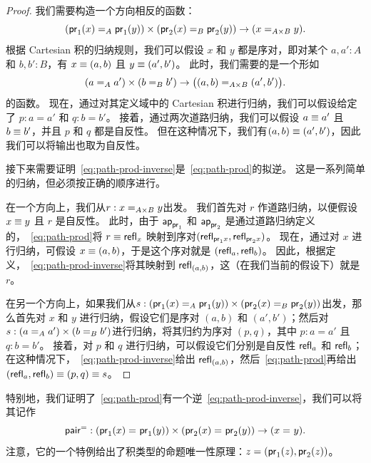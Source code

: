 \begin{proof}
  我们需要构造一个方向相反的函数：
  \begin{equation}
    (\id[A]{\proj1(x)}{\proj1(y)}) \times (\id[B]{\proj2(x)}{\proj2(y)}) \to (\id[A\times B]{x}{y}). \label{eq:path-prod-inverse}
  \end{equation}
  根据 Cartesian 积的归纳规则，我们可以假设 $x$ 和 $y$ 都是序对，即对某个 $a,a':A$ 和 $b,b':B$，有 $x\jdeq (a,b)$ 且 $y\jdeq (a',b')$。
  此时，我们需要的是一个形如
  \begin{equation*}
    (\id[A]{a}{a'}) \times (\id[B]{b}{b'}) \to \big(\id[A\times B]{(a,b)}{(a',b')}\big).
  \end{equation*}
  的函数。
  现在，通过对其定义域中的 Cartesian 积进行归纳，我们可以假设给定了 $p:a=a'$ 和 $q:b=b'$。
  接着，通过两次道路归纳，我们可以假设 $a\jdeq a'$ 且 $b\jdeq b'$，并且 $p$ 和 $q$ 都是自反性。
  但在这种情况下，我们有$(a,b)\jdeq(a',b')$，因此我们可以将输出也取为自反性。

  接下来需要证明~\eqref{eq:path-prod-inverse}是~\eqref{eq:path-prod}的拟逆。
  这是一系列简单的归纳，但必须按正确的顺序进行。

  在一个方向上，我们从$r:\id[A\times B]{x}{y}$出发。
  我们首先对 $r$ 作道路归纳，以便假设 $x\jdeq y$ 且 $r$ 是自反性。
  此时，由于 $\apfunc{\proj1}$ 和 $\apfunc{\proj2}$ 是通过道路归纳定义的，~\eqref{eq:path-prod}将 $r\jdeq \refl{x}$ 映射到序对$(\refl{\proj1x},\refl{\proj2x})$。
  现在，通过对 $x$ 进行归纳，可假设 $x\jdeq (a,b)$，于是这个序对就是 $(\refl a, \refl b)$。
  因此，根据定义，~\eqref{eq:path-prod-inverse}将其映射到 $\refl{(a,b)}$，这（在我们当前的假设下）就是 $r$。

  在另一个方向上，如果我们从$s:(\id[A]{\proj1(x)}{\proj1(y)}) \times (\id[B]{\proj2(x)}{\proj2(y)})$出发，那么首先对 $x$ 和 $y$ 进行归纳，假设它们是序对 $(a,b)$ 和 $(a',b')$；然后对$s:(\id[A]{a}{a'}) \times (\id[B]{b}{b'})$进行归纳，将其归约为序对 $(p,q)$，其中 $p:a=a'$ 且 $q:b=b'$。
  接着，对 $p$ 和 $q$ 进行归纳，可以假设它们分别是自反性 $\refl a$ 和 $\refl b$；在这种情况下，~\eqref{eq:path-prod-inverse}给出 $\refl{(a,b)}$，然后~\eqref{eq:path-prod}再给出$(\refl a,\refl b)\jdeq (p,q)\jdeq s$。
\end{proof}

特别地，我们证明了~\eqref{eq:path-prod}有一个逆~\eqref{eq:path-prod-inverse}，我们可以将其记作
\[
\pairpath : (\id{\proj{1}(x)}{\proj{1}(y)}) \times (\id{\proj{2}(x)}{\proj{2}(y)}) \to (\id x y).
\]
注意，它的一个特例给出了积类型的命题唯一性原理：$z = (\proj1(z),\proj2(z))$。

